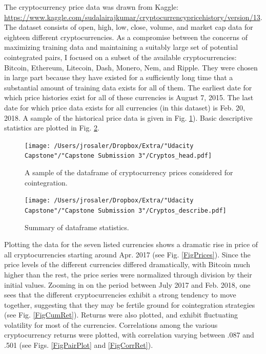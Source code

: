 \documentclass{article}
\begin{document}
The cryptocurrency price data was drawn from Kaggle: \url{https://www.kaggle.com/sudalairajkumar/cryptocurrencypricehistory/version/13}. The dataset consists of open, high, low, close, volume, and market cap data for eighteen different cryptocurrencies. As a compromise between the concerns of maximizing training data and maintaining a suitably large set of potential cointegrated pairs, I focused on a subset of the available cryptocurrencies: Bitcoin, Ethereum, Litecoin, Dash, Monero, Nem, and Ripple. They were chosen in large part because they have existed for a sufficiently long time that a substantial amount of training data exists for all of them. The earliest date for which price histories exist for all of these currencies is August 7, 2015. The last date for which price data exists for all currencies (in this dataset) is Feb. 20, 2018. A sample of the historical price data is given in Fig. \ref{FigSample}). Basic descriptive statistics are plotted in Fig. \ref{FigStats}.






\begin{figure}[]
\texttt{[image: /Users/jrosaler/Dropbox/Extra/"Udacity Capstone"/"Capstone Submission 3"/Cryptos\_head.pdf]}
\caption{A sample of the dataframe of cryptocurrency prices considered for cointegration. }
\label{FigSample}
\end{figure}

\begin{figure}[]
\texttt{[image: /Users/jrosaler/Dropbox/Extra/"Udacity Capstone"/"Capstone Submission 3"/Cryptos\_describe.pdf]}
\caption{Summary of dataframe statistics. }
\label{FigStats}
\end{figure}



Plotting the data for the seven listed currencies shows a dramatic rise in price of all cryptocurrencies starting around Apr. 2017 (see Fig. \ref{FigPrices}). Since the price levels of the different currencies differed dramatically, with Bitcoin much higher than the rest, the price series were normalized through division by their initial values. Zooming in on the period between July 2017 and Feb. 2018, one sees that the different cryptocurrencies exhibit a strong tendency to move together, suggesting that they may be fertile ground for cointegration strategies (see Fig. \ref{FigCumRet}). Returns were also plotted, and exhibit fluctuating volatility for most of the currencies. Correlations among the various cryptocurrency returns were plotted, with correlation varying between .087 and .501 (see Figs. \ref{FigPairPlot} and \ref{FigCorrRet}).
\end{document}
